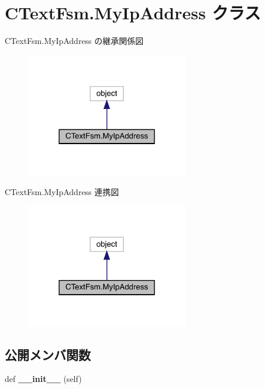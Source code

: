 \hypertarget{classCTextFsm_1_1MyIpAddress}{}\section{C\+Text\+Fsm.\+My\+Ip\+Address クラス}
\label{classCTextFsm_1_1MyIpAddress}


C\+Text\+Fsm.\+My\+Ip\+Address の継承関係図
\nopagebreak
\begin{figure}[H]
\begin{center}
\leavevmode
\includegraphics[width=202pt]{classCTextFsm_1_1MyIpAddress__inherit__graph}
\end{center}
\end{figure}


C\+Text\+Fsm.\+My\+Ip\+Address 連携図
\nopagebreak
\begin{figure}[H]
\begin{center}
\leavevmode
\includegraphics[width=202pt]{classCTextFsm_1_1MyIpAddress__coll__graph}
\end{center}
\end{figure}
\subsection*{公開メンバ関数}
\begin{DoxyCompactItemize}
\item 
\mbox{\label{classCTextFsm_1_1MyIpAddress_aedba27b663b3d844b2740e8b4d3e18dd}} 
def {\bfseries \+\_\+\+\_\+init\+\_\+\+\_\+} (self)
\end{DoxyCompactItemize}
